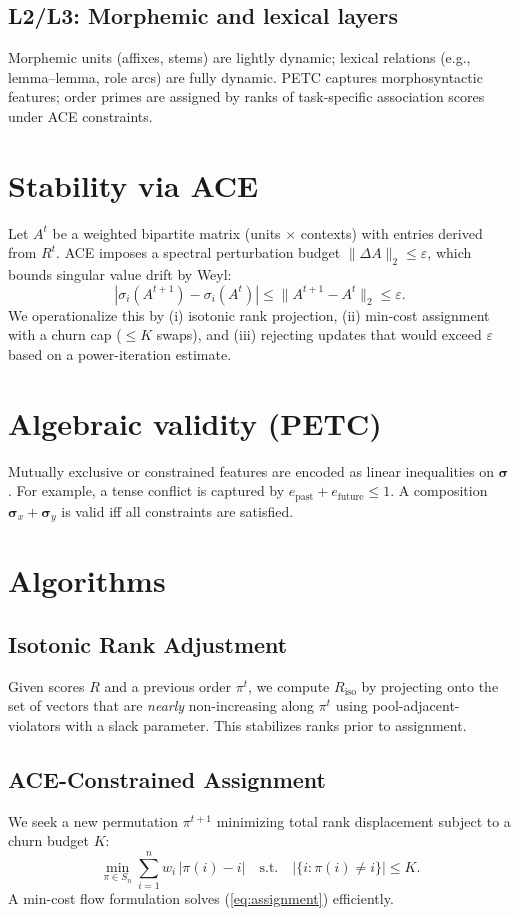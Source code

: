 \documentclass[11pt]{article}
\newcommand{\sig}{\boldsymbol{\sigma}}
\begin{document}
\subsection{L2/L3: Morphemic and lexical layers}
Morphemic units (affixes, stems) are lightly dynamic; lexical relations (e.g., lemma--lemma, role arcs) are fully dynamic. PETC captures morphosyntactic features; order primes are assigned by ranks of task-specific association scores under ACE constraints.

\section{Stability via ACE}
Let $A^t$ be a weighted bipartite matrix (units $\times$ contexts) with entries derived from $R^t$. ACE imposes a spectral perturbation budget $\|\Delta A\|_2\le \varepsilon$, which bounds singular value drift by Weyl:
\begin{equation}
  |\sigma_i(A^{t+1})-\sigma_i(A^{t})| \le \|A^{t+1}-A^{t}\|_2 \le \varepsilon.\label{eq:weyl}
\end{equation}
We operationalize this by (i) isotonic rank projection, (ii) min-cost assignment with a churn cap (\(\le K\) swaps), and (iii) rejecting updates that would exceed $\varepsilon$ based on a power-iteration estimate.

\section{Algebraic validity (PETC)}
Mutually exclusive or constrained features are encoded as linear inequalities on $\sig$. For example, a tense conflict is captured by $e_{\text{past}}+e_{\text{future}}\le 1$. A composition $\sig_x+\sig_y$ is valid iff all constraints are satisfied.

\section{Algorithms}
\subsection{Isotonic Rank Adjustment}
Given scores $R$ and a previous order $\pi^{t}$, we compute $R_{\text{iso}}$ by projecting onto the set of vectors that are \emph{nearly} non-increasing along $\pi^{t}$ using pool-adjacent-violators with a slack parameter. This stabilizes ranks prior to assignment.

\subsection{ACE-Constrained Assignment}
We seek a new permutation $\pi^{t+1}$ minimizing total rank displacement subject to a churn budget $K$:
\begin{equation}
  \min_{\pi\in S_n} \sum_{i=1}^n w_{i}\,|\pi(i)-i| \quad \text{s.t.}\quad |\{i: \pi(i)\ne i\}| \le K. \label{eq:assignment}
\end{equation}
A min-cost flow formulation solves (\ref{eq:assignment}) efficiently.
\end{document}

